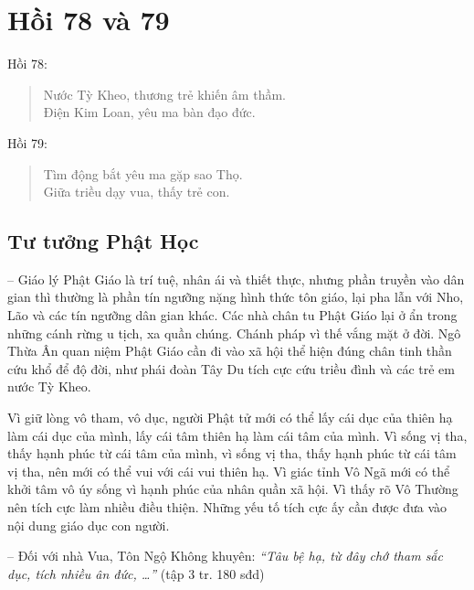 \chapter{Hồi 78 và 79} %
\label{cha:hoi_78_79}

Hồi 78:

\begin{verse}
\begin{itshape}
Nước Tỳ Kheo, thương trẻ khiến âm thầm.\\
Điện Kim Loan, yêu ma bàn đạo đức.
\end{itshape}
\end{verse}

Hồi 79:

\begin{verse}
\begin{itshape}
Tìm động bắt yêu ma gặp sao Thọ.\\
Giữa triều dạy vua, thấy trẻ con.
\end{itshape}
\end{verse}

\section{Tư tưởng Phật Học} %
\label{sec:78_79_phat_hoc}

-- Giáo lý Phật Giáo là trí tuệ, nhân ái và thiết thực, nhưng phần truyền vào dân gian thì thường là phần tín ngưỡng nặng hình thức tôn giáo, lại pha lẫn với Nho, Lão và các tín ngưỡng dân gian khác. Các nhà chân tu Phật Giáo lại ở ẩn trong những cánh rừng u tịch, xa quần chúng. Chánh pháp vì thế vắng mặt ở đời. Ngô Thừa Ân quan niệm Phật Giáo cần đi vào xã hội thể hiện đúng chân tinh thần cứu khổ để độ đời, như phái đoàn Tây Du tích cực cứu triều đình và các trẻ em nước Tỳ Kheo.

Vì giữ lòng vô tham, vô dục, người Phật tử mới có thể lấy cái dục của thiên hạ làm cái dục của mình, lấy cái tâm thiên hạ làm cái tâm của mình. Vì sống vị tha, thấy hạnh phúc từ cái tâm của mình, vì sống vị tha, thấy hạnh phúc từ cái tâm vị tha, nên mới có thể vui với cái vui thiên hạ. Vì giác tỉnh Vô Ngã mới có thể khởi tâm vô úy sống vì hạnh phúc của nhân quần xã hội. Vì thấy rõ Vô Thường nên tích cực làm nhiều điều thiện. Những yếu tố tích cực ấy cần được đưa vào nội dung giáo dục con người.

-- Đối với nhà Vua, Tôn Ngộ Không khuyên: \emph{``Tâu bệ hạ, từ đây chớ tham sắc dục, tích nhiều ân đức, \ldots''} (tập 3 tr. 180 sđd)

